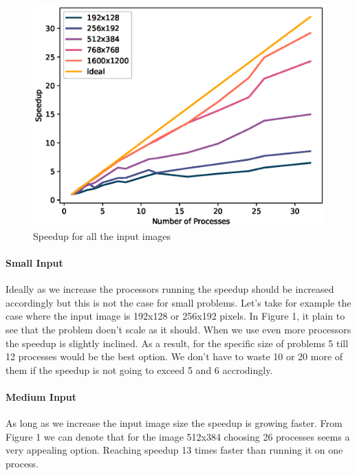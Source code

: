 \documentclass[12pt,a4paper]{article}
\begin{document}
            \begin{figure}[ht]
                \centering
                \includegraphics[scale=0.6]{../graphs/Speedup.eps}
                \caption{Speedup for all the input images}
                \label{speedup}
            \end{figure}

            \paragraph{Small Input}
                Ideally as we increase the processors running the speedup should be increased accordingly but this is not the case for small problems. Let's take for example the case where the input image is 192x128 or 256x192 pixels. In Figure 1, it plain to see that the problem doen't scale as it should. When we use even more processors the speedup is slightly inclined. As a result, for the specific size of problems 5 till 12 processes would be the best option. We don't have to waste 10 or 20 more of them if the speedup is not going to exceed 5 and 6 accrodingly.
 
             \paragraph{Medium Input}
                As long as we increase the input image size the speedup is growing faster. From Figure 1 we can denote that for the image 512x384 choosing 26 processes seems a very appealing option. Reaching speedup 13 times faster than running it on one process.
\end{document}
